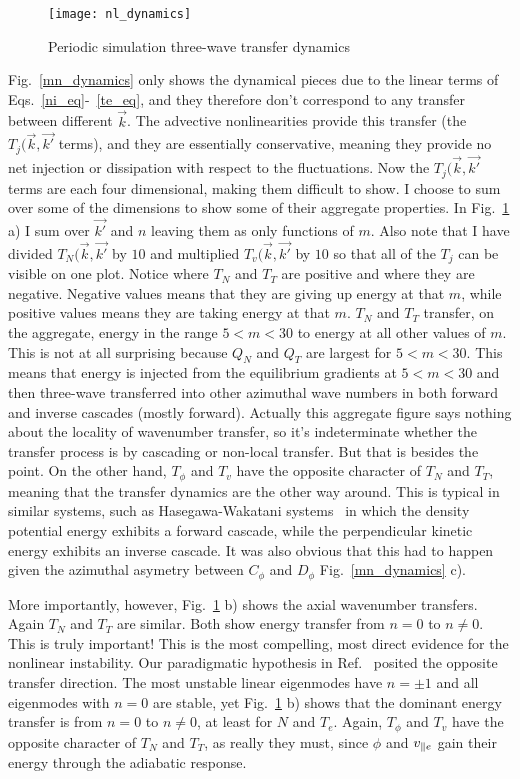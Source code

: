 \begin{figure}[!ht]
\centerline{\texttt{[image: nl\_dynamics]}}
\caption{Periodic simulation three-wave transfer dynamics}
\label{nl_dynamics}
\end{figure}

Fig.~\ref{mn_dynamics} only shows the dynamical pieces due to the linear terms of Eqs.~\ref{ni_eq}-~\ref{te_eq}, and they therefore don't correspond to any transfer between different $\vec{k}$.
The advective nonlinearities provide this transfer (the $T_j(\vec{k},\vec{k'}$ terms), 
and they are essentially conservative, meaning they provide no net injection or dissipation with respect to the fluctuations. Now the $T_j(\vec{k},\vec{k'}$ terms are each four dimensional,
making them difficult to show. I choose to sum over some of the dimensions to show some of their aggregate properties. In Fig.~\ref{nl_dynamics} a) I sum over $\vec{k'}$ and $n$ leaving them
as only functions of $m$. Also note that I have divided $T_N(\vec{k},\vec{k'}$ by $10$ and multiplied $T_v(\vec{k},\vec{k'}$ by $10$ so that all of the $T_j$ can be visible on one plot.
Notice where $T_N$ and $T_T$ are positive and where they are negative. Negative values means that they are giving up energy at that $m$, while positive values means they are taking energy
at that $m$. $T_N$ and $T_T$ transfer, on the aggregate, energy in the range $5 < m < 30$ to energy at all other values of $m$. This is not at all surprising because $Q_N$ and $Q_T$ are largest
for $5 < m < 30$. This means that energy is injected from the equilibrium gradients at $5 < m < 30$ and then three-wave transferred into other azimuthal wave numbers in both forward and inverse
cascades (mostly forward). 
Actually this aggregate figure says nothing about the locality of wavenumber transfer, so it's indeterminate whether the transfer process is by cascading or non-local transfer. But that
is besides the point. On the other hand, $T_\phi$ and $T_v$ have the opposite character of $T_N$ and $T_T$, meaning that the transfer dynamics are the other way around. This is typical in 
similar systems, such as Hasegawa-Wakatani systems~\cite{hasegawa1983,Camargo1995} in which the density potential energy exhibits a forward cascade, while the perpendicular kinetic energy
exhibits an inverse cascade. It was also obvious that this had to happen given the azimuthal asymetry between $C_\phi$ and $D_\phi$ Fig.~\ref{mn_dynamics} c).

More importantly, however, Fig.~\ref{nl_dynamics} b) shows the axial wavenumber transfers. Again $T_N$ and $T_T$ are similar. Both show energy transfer from $n=0$ to $n \ne 0$. This is truly important!
This is the most compelling, most direct evidence for the nonlinear instability.
Our paradigmatic hypothesis in Ref.~\cite{Umansky2011} posited the opposite transfer direction. The most unstable linear eigenmodes have $n = \pm 1$ and all eigenmodes with $n=0$ are stable,
yet Fig.~\ref{nl_dynamics} b) shows that the dominant energy transfer is from $n=0$ to $n \ne 0$, at least for $N$ and $T_e$. Again, $T_\phi$ and $T_v$ have the opposite character of $T_N$ and $T_T$,
as really they must, since $\phi$ and $v_{\parallel e}$ gain their energy through the adiabatic response.

